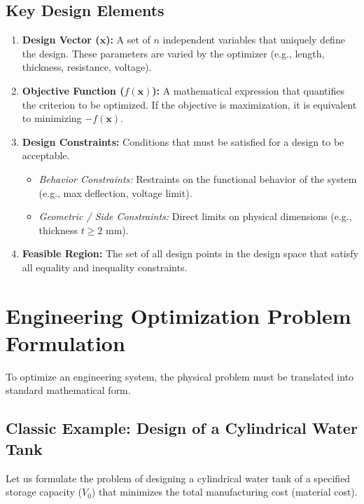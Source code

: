 \documentclass[12pt,a4paper]{article}
\begin{document}
\subsection{Key Design Elements}
\begin{enumerate}[label=\textbf{\arabic*.}, leftmargin=*, itemsep=4pt]
  \item \textbf{Design Vector (\texorpdfstring{$\mathbf{x}$}{x}):} A set of $n$ independent variables that uniquely define the design. These parameters are varied by the optimizer (e.g., length, thickness, resistance, voltage).
  \item \textbf{Objective Function (\texorpdfstring{$f(\mathbf{x})$}{f(x)}):} A mathematical expression that quantifies the criterion to be optimized. If the objective is maximization, it is equivalent to minimizing $-f(\mathbf{x})$.
  \item \textbf{Design Constraints:} Conditions that must be satisfied for a design to be acceptable.
    \begin{itemize}[label=\tiny$\bullet$, leftmargin=1.5em, itemsep=2pt]
      \item \textit{Behavior Constraints:} Restraints on the functional behavior of the system (e.g., max deflection, voltage limit).
      \item \textit{Geometric / Side Constraints:} Direct limits on physical dimensions (e.g., thickness $t \ge 2\text{ mm}$).
    \end{itemize}
  \item \textbf{Feasible Region:} The set of all design points in the design space that satisfy all equality and inequality constraints.
\end{enumerate}

\section{Engineering Optimization Problem Formulation}

To optimize an engineering system, the physical problem must be translated into standard mathematical form.

\subsection{Classic Example: Design of a Cylindrical Water Tank}
Let us formulate the problem of designing a cylindrical water tank of a specified storage capacity ($V_0$) that minimizes the total manufacturing cost (material cost).
\end{document}

